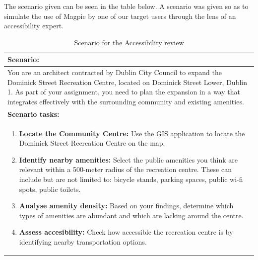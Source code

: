 The scenario given can be seen in the table below. A scenario was given so as to
simulate the use of Magpie by one of our target users through the lens of an
accessibility expert.

\begin{table}[h!]
    \centering
    \caption{Scenario for the Accessibility review}
    \begin{tabular}{|p{}|}
        \hline
        \textbf{Scenario:}                                                                                                                                                                                                                                                                                         \\
        \hline
        You are an architect contracted by Dublin City Council to expand the Dominick Street Recreation Centre, located on Dominick Street Lower, Dublin 1. As part of your assignment, you need to plan the expansion in a way that integrates effectively with the surrounding community and existing amenities. \\
        \hline
        \textbf{Scenario tasks:}                                                                                                                                                                                                                                                                                   \\
        \hline
        \begin{enumerate}
            \item \textbf{Locate the Community Centre:} Use the GIS application
                  to locate the Dominick Street Recreation Centre on the map.
            \item \textbf{Identify nearby amenities:} Select the public
                  amenities you think are relevant within a 500-meter radius of the
                  recreation centre. These can include but are not limited to: bicycle
                  stands, parking spaces, public wi-fi spots, public toilets.
            \item \textbf{Analyse amenity density:} Based on your findings,
                  determine which types of amenities are abundant and which are
                  lacking around the centre.
            \item \textbf{Assess accesibility:} Check how accessible the
                  recreation centre is by identifying nearby transportation options.

\end{enumerate}
\end{tabular}
\end{table}
